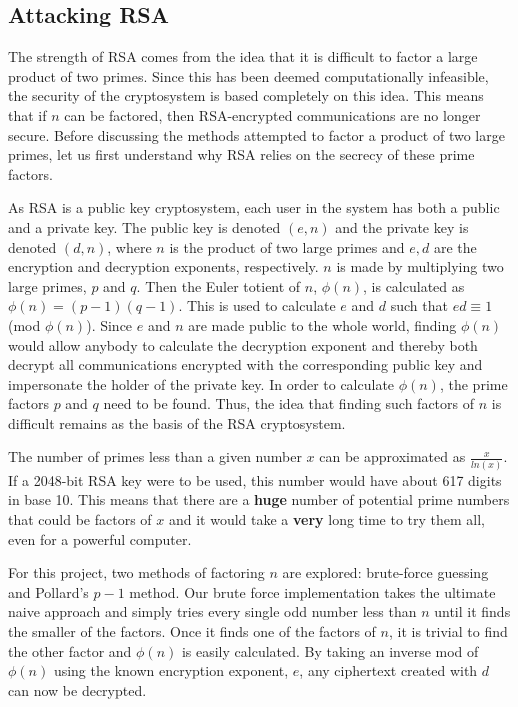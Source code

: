 \documentclass[12pt]{report}
\begin{document}
\subsection{Attacking RSA}
The strength of RSA comes from the idea that it is difficult to factor a large product of two primes. Since this has been deemed computationally infeasible, the
security of the cryptosystem is based completely on this idea. This means that if $n$ can be factored, then RSA-encrypted communications are no longer secure.
Before discussing the methods attempted to factor a product of two large primes, let us first understand why RSA relies on the secrecy of these prime factors.

As RSA is a public key cryptosystem, each user in the system has both a public and a private key. The public key is denoted $(e,n)$ and the private key is denoted
$(d,n)$, where $n$ is the product of two large primes and $e,d$ are the encryption and decryption exponents, respectively. $n$ is made by multiplying two large
primes, $p$ and $q$. Then the Euler totient of $n$, $\phi(n)$, is calculated as $\phi(n) = (p-1)(q-1)$. This is used to calculate $e$ and $d$ such that
$ed \equiv 1$ (mod $\phi(n)$). Since $e$ and $n$ are made public to the whole world, finding $\phi(n)$ would allow anybody to calculate the decryption exponent and
thereby both decrypt all communications encrypted with the corresponding public key and impersonate the holder of the private key. In order to calculate $\phi(n)$,
the prime factors $p$ and $q$ need to be found. Thus, the idea that finding such factors of $n$ is difficult remains as the basis of the RSA cryptosystem.

The number of primes less than a given number $x$ can be approximated as $\frac{x}{ln(x)}$. If a 2048-bit RSA key were to be used, this number would have about 617
digits in base 10. This means that there are a \textbf{huge} number of potential prime numbers that could be factors of $x$ and it would take a \textbf{very} long
time to try them all, even for a powerful computer.

For this project, two methods of factoring $n$ are explored: brute-force guessing and Pollard's $p-1$ method.\cite{pollard} Our brute force implementation takes the
ultimate naive approach and simply tries every single odd number less than $n$ until it finds the smaller of the factors. Once it finds one of the factors of $n$,
it is trivial to find the other factor and $\phi(n)$ is easily calculated. By taking an inverse mod of $\phi(n)$ using the known encryption exponent, $e$, any
ciphertext created with $d$ can now be decrypted.
\end{document}
